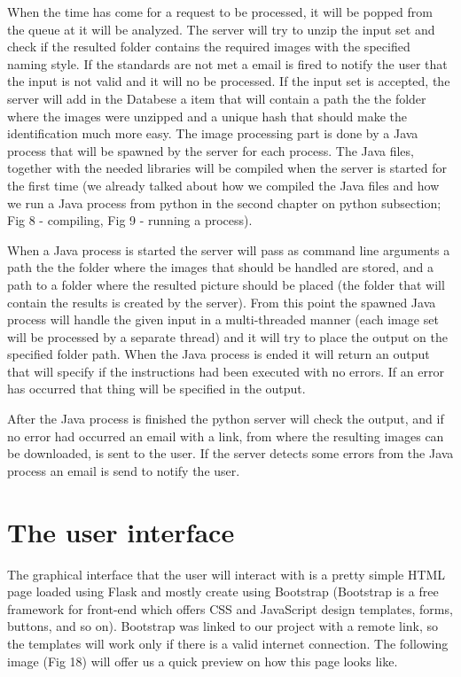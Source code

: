 \documentclass[12pt, a4paper]{report}
\begin{document}
When the time has come for a request to be processed, it will be popped from the queue at it will be analyzed. The server will try to unzip the input set and check if the resulted folder contains the required images with the specified naming style. If the standards are not met a email is fired to notify the user that the input is not valid and it will no be processed. If the input set is accepted, the server will add in the Databese a item that will contain a path the the folder where the images were unzipped and a unique hash that should make the identification much more easy. The image processing part is done by a Java process that will be spawned by the server for each process. The Java files, together with the needed libraries will be compiled when the server is started for the first time (we already talked about how we compiled the Java files and how we run a Java process from python in the second chapter on python subsection; Fig 8 - compiling, Fig 9 - running a process). 
\par 

When a Java process is started the server will pass as command line arguments a path the the folder where the images that should be handled are stored, and a path to a folder where the resulted picture should be placed (the folder that will contain the results is created by the server). From this point the spawned Java process will handle the given input in a multi-threaded manner (each image set will be processed by a separate thread) and it will try to place the output on the specified folder path. When the Java process is ended it will return an output that will specify if the instructions had been executed with no errors. If an error has occurred that thing will be specified in the output. 
\par 

After the Java process is finished the python server will check the output, and if no error had occurred an email with a link, from where the resulting images can be downloaded, is sent to the user. If the server detects some errors from the Java process an email is send to notify the user.



\newpage
\section{The user interface}

\quad
The graphical interface that the user will interact with is a pretty simple HTML page loaded using Flask and mostly create using Bootstrap (Bootstrap is a free framework for front-end which offers CSS and JavaScript design templates, forms, buttons, and so on). Bootstrap was linked to our project with a remote link, so the templates will work only if there is a valid internet connection. The following image (Fig 18) will offer us a quick preview on how this page looks like.
\end{document}
